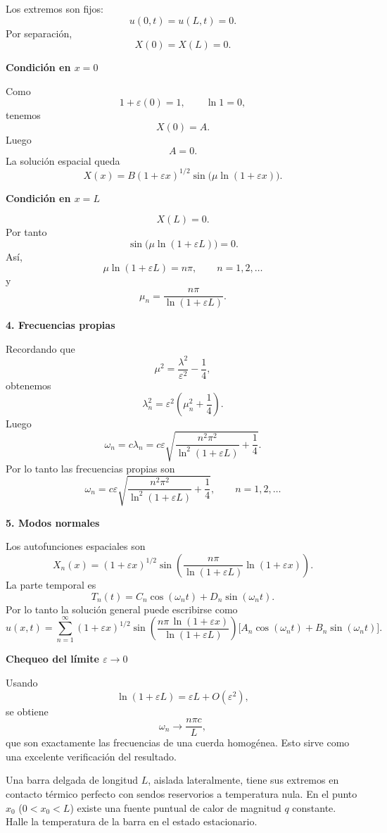 \documentclass[11pt,spanish]{article}
\newcounter{problema}
\newcommand{\prob}{\stepcounter{problema} \vspace{.5cm} \noindent{\bf Problema \arabic{problema}: }}
\begin{document}
Los extremos son fijos:
$$
u(0,t)=u(L,t)=0.
$$
Por separación,
$$
X(0)=X(L)=0.
$$

{\bf Condición en $x=0$}

Como
$$
1+\varepsilon(0)=1,
\qquad
\ln1=0,
$$
tenemos
$$
X(0)=A.
$$
Luego
$$
A=0.
$$
La solución espacial queda
$$
X(x)
=
B(1+\varepsilon x)^{1/2}
\sin\big(\mu\ln(1+\varepsilon x)\big).
$$

{\bf Condición en $x=L$}

$$
X(L)=0.
$$
Por tanto
$$
\sin\Big(
\mu\ln(1+\varepsilon L)
\Big)=0.
$$
Así,
$$
\mu\ln(1+\varepsilon L)=n\pi,
\qquad n=1,2,\dots
$$
y
$$
\boxed{
\mu_n=
\frac{n\pi}
{\ln(1+\varepsilon L)}
}.
$$

{\bf 4. Frecuencias propias}

Recordando que
$$
\mu^2
=
\frac{\lambda^2}{\varepsilon^2}
-\frac14,
$$
obtenemos
$$
\lambda_n^2
=
\varepsilon^2
\left(
\mu_n^2+\frac14
\right).
$$
Luego
$$
\omega_n
=
c\lambda_n
=
c\varepsilon
\sqrt{
\frac{n^2\pi^2}
{\ln^2(1+\varepsilon L)}
+\frac14
}.
$$
Por lo tanto las frecuencias propias son
$$
\boxed{
\omega_n
=
c\varepsilon
\sqrt{
\frac{n^2\pi^2}
{\ln^2(1+\varepsilon L)}
+\frac14
},
\qquad n=1,2,\ldots
}
$$

{\bf 5. Modos normales}

Los autofunciones espaciales son
$$
\boxed{
X_n(x)
=
(1+\varepsilon x)^{1/2}
\sin\left(
\frac{n\pi}
{\ln(1+\varepsilon L)}
\ln(1+\varepsilon x)
\right).
}
$$
La parte temporal es
$$
T_n(t)
=
C_n\cos(\omega_n t)
+
D_n\sin(\omega_n t).
$$
Por lo tanto la solución general puede escribirse como
$$
\boxed{
u(x,t)
=
\sum_{n=1}^{\infty}
(1+\varepsilon x)^{1/2}
\sin\left(
\frac{n\pi\,\ln(1+\varepsilon x)}
{\ln(1+\varepsilon L)}
\right)
\Big[
A_n\cos(\omega_n t)
+
B_n\sin(\omega_n t)
\Big].
}
$$

{\bf Chequeo del límite $\varepsilon\to0$}

Usando
$$
\ln(1+\varepsilon L)
=
\varepsilon L+O(\varepsilon^2),
$$
se obtiene
$$
\omega_n
\longrightarrow
\frac{n\pi c}{L},
$$
que son exactamente las frecuencias de una cuerda homogénea. Esto sirve como una excelente verificación del resultado.








\prob Una barra delgada de longitud $L$, aislada lateralmente, tiene sus extremos en contacto térmico perfecto con sendos reservorios a temperatura nula. En el punto $x_0$ ($0<x_0<L$) existe una fuente puntual de calor de magnitud $q$ constante. Halle la temperatura de la barra en el estado estacionario.
\end{document}
